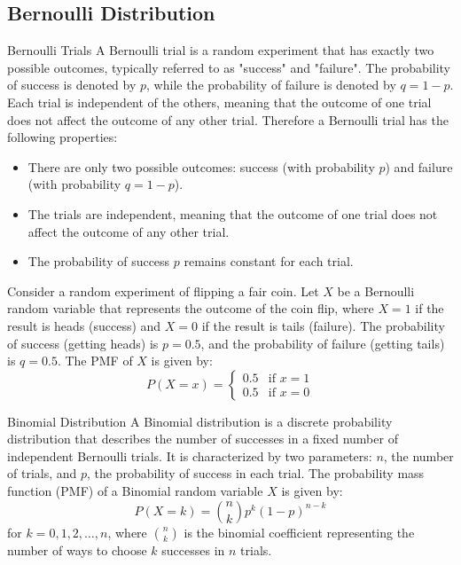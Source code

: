 \documentclass[openany]{book}
\begin{document}
\subsection{Bernoulli Distribution}
\begin{mydefinition}{Bernoulli Trials}
    A Bernoulli trial is a random experiment that has exactly two possible outcomes, typically referred to as "success" and "failure". The probability of success is denoted by $p$, while the probability of failure is denoted by $q = 1 - p$. Each trial is independent of the others, meaning that the outcome of one trial does not affect the outcome of any other trial. Therefore a Bernoulli trial has the following properties: 
    \begin{itemize}
        \item There are only two possible outcomes: success (with probability $p$) and failure (with probability $q = 1 - p$).
        \item The trials are independent, meaning that the outcome of one trial does not affect the outcome of any other trial.
        \item The probability of success $p$ remains constant for each trial.
    \end{itemize}
\end{mydefinition}
\begin{example}
    Consider a random experiment of flipping a fair coin. Let $X$ be a Bernoulli random variable that represents the outcome of the coin flip, where $X = 1$ if the result is heads (success) and $X = 0$ if the result is tails (failure). The probability of success (getting heads) is $p = 0.5$, and the probability of failure (getting tails) is $q = 0.5$. The PMF of $X$ is given by:
    $$P(X = x) = 
    \begin{cases} 
    0.5 & \text{if } x = 1 \\
    0.5 & \text{if } x = 0 
    \end{cases}$$
\end{example}
\begin{mydefinition}{Binomial Distribution}
    A Binomial distribution is a discrete probability distribution that describes the number of successes in a fixed number of independent Bernoulli trials. It is characterized by two parameters: $n$, the number of trials, and $p$, the probability of success in each trial. The probability mass function (PMF) of a Binomial random variable $X$ is given by:
    $$P(X = k) = \binom{n}{k} p^k (1 - p)^{n - k}$$
    for $k = 0, 1, 2, \ldots, n$, where $\binom{n}{k}$ is the binomial coefficient representing the number of ways to choose $k$ successes in $n$ trials.
\end{mydefinition}
\end{document}
